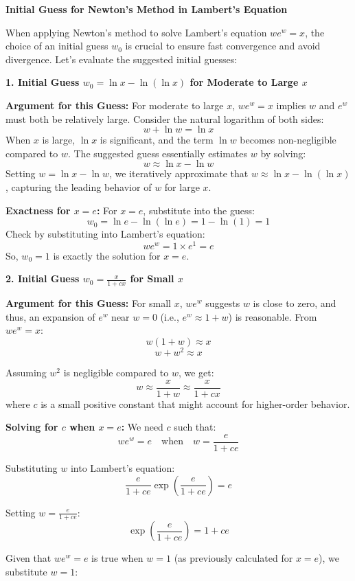 \documentclass[8pt]{article}
\begin{document}
\textbf{Initial Guess for Newton's Method in Lambert's Equation}

When applying Newton's method to solve Lambert's equation \(we^w = x\), the choice of an initial guess \(w_0\) is crucial to ensure fast convergence and avoid divergence. Let's evaluate the suggested initial guesses:

\textbf{1. Initial Guess \(w_0 = \ln x - \ln(\ln x)\) for Moderate to Large \(x\)}

\textbf{Argument for this Guess:}
For moderate to large \(x\), \(we^w = x\) implies \(w\) and \(e^w\) must both be relatively large. Consider the natural logarithm of both sides:
\[ w + \ln w = \ln x \]
When \(x\) is large, \(\ln x\) is significant, and the term \(\ln w\) becomes non-negligible compared to \(w\). The suggested guess essentially estimates \(w\) by solving:
\[ w \approx \ln x - \ln w \]
Setting \(w = \ln x - \ln w\), we iteratively approximate that \(w \approx \ln x - \ln(\ln x)\), capturing the leading behavior of \(w\) for large \(x\).

\textbf{Exactness for \(x = e\):}
For \(x = e\), substitute into the guess:
\[ w_0 = \ln e - \ln(\ln e) = 1 - \ln(1) = 1 \]
Check by substituting into Lambert's equation:
\[ we^w = 1 \times e^1 = e \]
So, \(w_0 = 1\) is exactly the solution for \(x = e\).

\textbf{2. Initial Guess \(w_0 = \frac{x}{1 + cx}\) for Small \(x\)}

\textbf{Argument for this Guess:}
For small \(x\), \(we^w\) suggests \(w\) is close to zero, and thus, an expansion of \(e^w\) near \(w = 0\) (i.e., \(e^w \approx 1 + w\)) is reasonable. From \(we^w = x\):
\[ w(1 + w) \approx x \]
\[ w + w^2 \approx x \]

Assuming \(w^2\) is negligible compared to \(w\), we get:
\[ w \approx \frac{x}{1 + w} \approx \frac{x}{1 + cx} \]
where \(c\) is a small positive constant that might account for higher-order behavior.

\textbf{Solving for \(c\) when \(x = e\):}
We need \(c\) such that:
\[ we^w = e \quad \text{when} \quad w = \frac{e}{1 + ce} \]

Substituting \(w\) into Lambert's equation:
\[ \frac{e}{1 + ce} \exp\left(\frac{e}{1 + ce}\right) = e \]

Setting \(w = \frac{e}{1 + ce}\):
\[ \exp\left(\frac{e}{1 + ce}\right) = 1 + ce \]

Given that \(we^w = e\) is true when \(w = 1\) (as previously calculated for \(x = e\)), we substitute \(w = 1\):
\end{document}
